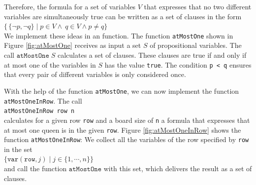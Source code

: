 \noindent
Therefore, the formula for a set of variables $V$ that expresses that no two different
variables are simultaneously true can be written as a set of clauses in the form
\\[0.2cm]
\hspace*{1.3cm}
$\bigl\{\, \{ \neg p, \neg q \} \;|\; p \in V \wedge\ q \in V \wedge p \neq q \bigr\}$
\\[0.2cm]
We implement these ideas in an \Fsharp{} function. The function \texttt{atMostOne} shown in Figure
\ref{fig:atMostOne} receives as input a set $S$ of propositional variables. The call $\texttt{atMostOne}\;S$
calculates a set of clauses. These clauses are true if and only if at most one of the variables in $S$
has the value \texttt{true}.  The condition \texttt{p < q} ensures that every pair of different variables is
only considered once.

With the help of the function \texttt{atMostOne}, we can now implement the function
\texttt{atMostOneInRow}. The call \\[0.2cm]
\hspace*{1.3cm} 
\texttt{atMostOneInRow row n} \\[0.2cm]
calculates for a given row \texttt{row} and a board size of \texttt{n} a formula
that expresses that at most one queen is in the given \texttt{row}.
Figure \ref{fig:atMostOneInRow} shows the
function \texttt{atMostOneInRow}: We collect all the variables of the row specified by \texttt{row}
in the set 
\\[0.2cm]
\hspace*{1.3cm}
$\bigl\{ \texttt{var}(\texttt{row},j) \mid j \in \{1, \cdots, n \} \bigr\}$
\\[0.2cm]
and call the function $\texttt{atMostOne}$ with this set, which delivers the result
as a set of clauses.


